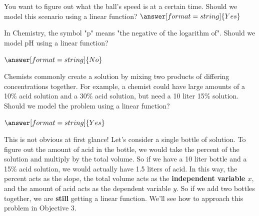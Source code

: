 \documentclass{ximera}
\begin{document}
\begin{question}
You want to figure out what the ball's speed is at a certain time. Should we model this scenario using a linear function?
$\answer[format=string]{Yes}$
\end{question}

\begin{question}
In Chemistry, the symbol "p" means "the negative of the logarithm of". Should we model pH using a linear function? 

$\answer[format=string]{No}$
\end{question}

\begin{question}
Chemists commonly create a solution by mixing two products of differing concentrations together. For example, a chemist could have large amounts of a 10\% acid solution and a 30\% acid solution, but need a 10 liter 15\% solution. Should we model the problem using a linear function?

$\answer[format=string]{Yes}$

\begin{feedback}
This is not obvious at first glance! Let's consider a single bottle of solution. To figure out the amount of acid in the bottle, we would take the percent of the solution and multiply by the total volume. So if we have a 10 liter bottle and a 15\% acid solution, we would actually have 1.5 liters of acid. In this way, the percent acts as the slope, the total volume acts as the \textbf{independent variable $x$}, and the amount of acid acts as the dependent variable $y$. So if we add two bottles together, we are \textbf{still} getting a linear function. We'll see how to approach this problem in Objective 3.
\end{feedback}

\end{question}
\end{document}
